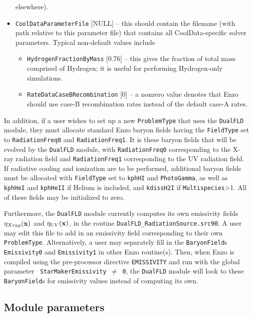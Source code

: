 \documentclass[letterpaper,10pt]{article}
\renewcommand{\(}{\left(}
\renewcommand{\)}{\right)}
\newcommand{\xvec}{{\bf x}}
\begin{document}
\begin{itemize}
  elsewhere).
\item {\tt CoolDataParameterFile} [NULL] -- this should contain the
  filename (with path relative to this parameter file) that contains
  all CoolData-specific solver parameters.  Typical non-default values
  include 
  \begin{itemize}
  \item {\tt HydrogenFractionByMass} [0.76] -- this gives the fraction of
    total mass comprised of Hydrogen; it is useful for performing Hydrogen-only
    simulations.
  \item {\tt RateDataCaseBRecombination} [0] -- a nonzero value
    denotes that Enzo should use case-B recombination rates instead of
    the default case-A rates.
  \end{itemize}
\end{itemize}

In addition, if a user wishes to set up a new {\tt ProblemType} that
uses the {\tt DualFLD} module, they must allocate standard Enzo
baryon fields having the {\tt FieldType} set to {\tt RadiationFreq0}
and {\tt RadiationFreq1}.  It is these baryon fields that will be
evolved by the {\tt DualFLD} module, with {\tt RadiationFreq0}
corresponding to the X-ray radiation field and {\tt RadiationFreq1}
corresponding to the UV radiation field. If radiative cooling and
ionization are to be performed, additional baryon fields must be allocated
with {\tt FieldType} set to {\tt kphHI} and {\tt PhotoGamma}, as well
as {\tt kphHeI} and {\tt kphHeII} if Helium is included, and 
{\tt kdissH2I} if {\tt Multispecies}>1.  All of these fields may be
initialized to zero.

Furthermore, the {\tt DualFLD} module currently computes its own
emissivity fields $\eta_{Xray}(\xvec)$ and  $\eta_{UV}(\xvec)$, in the
routine {\tt DualFLD\_RadiationSource.src90}.  A user may edit this file
to add in an emissivity field corresponding to their own {\tt
ProblemType}.  Alternatively, a user may separately fill in the  
{\tt BaryonField}s {\tt Emissivity0} and {\tt Emissivity1} in other
Enzo routine(s).  Then, when Enzo is compiled using the pre-processor
directive {\tt EMISSIVITY} and run with the global parameter {\tt
StarMakerEmissivity $\ne$ 0}, the {\tt DualFLD} module will look to
these {\tt BaryonField}s for emissivity values instead of computing
its own. 



\subsection{Module parameters}
\end{document}
